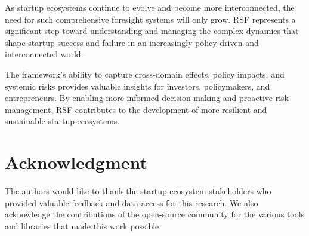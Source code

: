 \documentclass[conference]{IEEEtran}
\begin{document}
As startup ecosystems continue to evolve and become more interconnected, the need for such comprehensive foresight systems will only grow. RSF represents a significant step toward understanding and managing the complex dynamics that shape startup success and failure in an increasingly policy-driven and interconnected world.

The framework's ability to capture cross-domain effects, policy impacts, and systemic risks provides valuable insights for investors, policymakers, and entrepreneurs. By enabling more informed decision-making and proactive risk management, RSF contributes to the development of more resilient and sustainable startup ecosystems.

\section*{Acknowledgment}

The authors would like to thank the startup ecosystem stakeholders who provided valuable feedback and data access for this research. We also acknowledge the contributions of the open-source community for the various tools and libraries that made this work possible.
\end{document}
